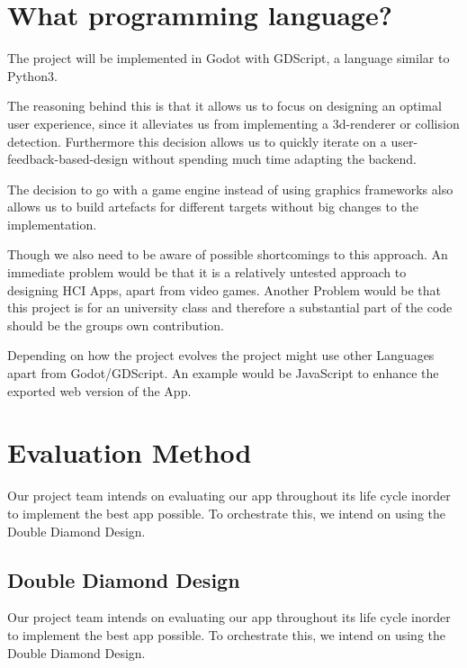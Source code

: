 \documentclass[ansiapaper,12pt]{article}
\begin{document}

\section{What programming language?}

The project will be implemented in Godot with GDScript, a language similar to
Python3.

The reasoning behind this is that it allows us to focus on designing an
optimal user experience, since it alleviates us from implementing a
3d-renderer or collision detection.
Furthermore this decision allows us to quickly iterate on a
user-feedback-based-design without spending much time adapting the
backend.

The decision to go with a game engine instead of using graphics
frameworks also allows us to build artefacts for different targets
without big changes to the implementation.

Though we also need to be aware of possible shortcomings to this approach.
An immediate problem would be that it is a relatively untested approach to
designing HCI Apps, apart from video games. Another Problem would be that
this project is for an university class and therefore a substantial
part of the code should be the groups own contribution.

Depending on how the project evolves the project might use other Languages
apart from Godot/GDScript. An example would be JavaScript to enhance the
exported web version of the App.

\section{Evaluation Method}

Our project team intends on evaluating our app throughout its life cycle inorder to implement the best app possible. To orchestrate this, we intend on using the Double Diamond Design.

\subsection{Double Diamond Design}

Our project team intends on evaluating our app throughout its life cycle inorder to implement the best app possible.
To orchestrate this, we intend on using the Double Diamond Design.
\end{document}

